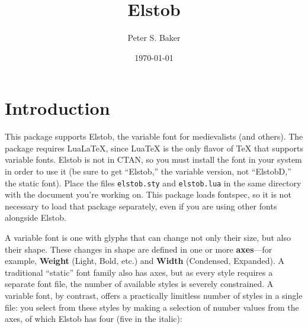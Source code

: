 \documentclass[12pt]{article}
\title{Elstob}
\author{Peter S. Baker}
\date{\today}
\newcommand{\ltech}{Lua\kern-1.5pt\TeX}
\newcommand{\lltech}{Lua\LaTeX}
\newcommand{\fspec}{{\sffamily fontspec}}
\newcommand{\src}[1]{{\color{BrickRed}\texttt{#1}}}
\begin{document}
\maketitle

\section{Introduction}

This package supports Elstob, the variable font for medievalists (and others).
The package requires \lltech, since {\ltech} is
the only flavor of {\TeX} that supports variable fonts. Elstob is not in CTAN, so you must
install the font in your system in order to use it (be sure to get “Elstob,” the variable
version, not “ElstobD,” the static font). Place the files \src{elstob.sty} and
\src{elstob.lua} in the same
directory with the document you're working on. This package loads
\fspec, so it is not necessary to load that package separately, even if you are using
other fonts alongside Elstob.

A variable font is one with glyphs that can change not only their size, but also their
shape. These changes in shape are defined in one or more \textbf{axes}---for example,
\textbf{Weight} (Light, Bold, etc.) and \textbf{Width} (Condensed, Expanded). A traditional
“static” font family also has axes, but as every style requires a separate font file,
the number of available styles is severely constrained. A variable font, by contrast,
offers a practically limitless number of styles in a single file: you select from these styles
by making a selection of number values from the axes, of which Elstob has four (five in the italic):
\end{document}
